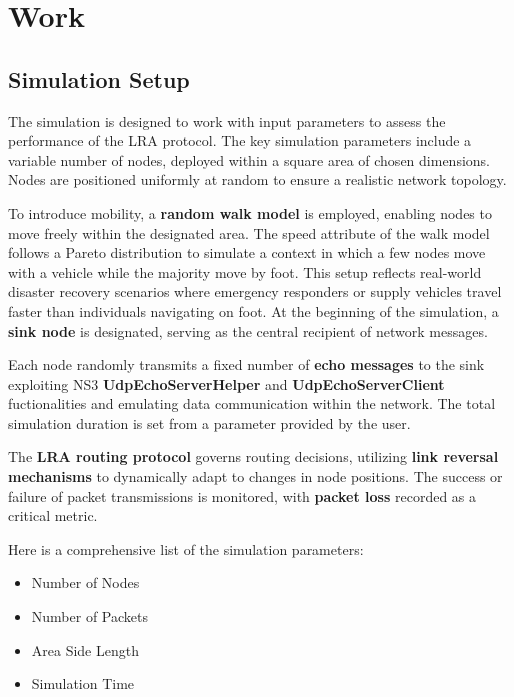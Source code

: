 \documentclass[../report.tex]{subfiles}
\begin{document}
\section{Work}

\subsection{Simulation Setup}
The simulation is designed to work with input parameters to assess the performance of the LRA protocol. The key simulation parameters include a variable number of nodes, deployed within a square area of chosen dimensions. Nodes are positioned uniformly at random to ensure a realistic network topology.

To introduce mobility, a \textbf{random walk model} is employed, enabling nodes to move freely within the designated area. The speed attribute of the walk model follows a Pareto distribution to simulate a context in which a few nodes move with a vehicle while the majority move by foot. This setup reflects real-world disaster recovery scenarios where emergency responders or supply vehicles travel faster than individuals navigating on foot.
At the beginning of the simulation, a \textbf{sink node} is designated, serving as the central recipient of network messages.

Each node randomly transmits a fixed number of \textbf{echo messages} to the sink exploiting NS3 \textbf{UdpEchoServerHelper} and \textbf{UdpEchoServerClient} fuctionalities and emulating data communication within the network. The total simulation duration is set from a parameter provided by the user.

The \textbf{LRA routing protocol} governs routing decisions, utilizing \textbf{link reversal mechanisms} to dynamically adapt to changes in node positions. The success or failure of packet transmissions is monitored, with \textbf{packet loss} recorded as a critical metric.

Here is a comprehensive list of the simulation parameters:
\begin{itemize}
    \item Number of Nodes
    \item Number of Packets
    \item Area Side Length
    \item Simulation Time
\end{itemize}
\end{document}
